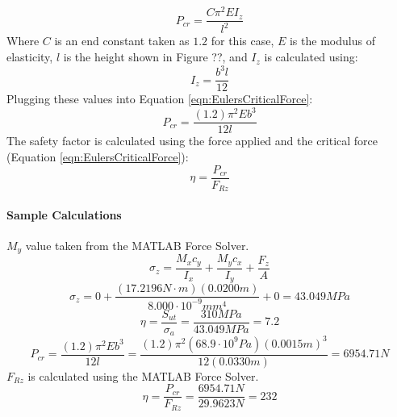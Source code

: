 \documentclass[../main.tex]{subfiles}
\begin{document}
\begin{equation} \label{eqn:EulersCriticalForce}
P_{cr} = \frac{C\pi^2EI_z}{l^2}
\end{equation}
Where $C$ is an end constant taken as $1.2$ for this case, $E$ is the modulus of elasticity, $l$ is the height shown in Figure ??, and $I_z$ is calculated using:
\begin{equation}
I_z = \frac{b^3l}{12}
\end{equation}
Plugging these values into Equation \ref{eqn:EulersCriticalForce}:
\begin{equation}
P_{cr} = \frac{(1.2)\pi^2Eb^3}{12l}
\end{equation}
The safety factor is calculated using the force applied and the critical force (Equation \ref{eqn:EulersCriticalForce}):
\begin{equation}
\eta = \frac{P_{cr}}{F_{Rz}}
\end{equation}
\paragraph*{Sample Calculations}
$M_y$ value taken from the MATLAB Force Solver.
$$\sigma_{z}={\frac{M_{x}c_y}{I_x}}+{\frac{M_{y}c_x}{I_y}}+{\frac{F_z}{A}}$$
$$\sigma_{z}=0+\frac{(17.2196N\cdot{}m)(0.0200m)}{8.000\cdot{}10^{-9}mm^4}+0 = 43.049MPa$$
$$\eta = \dfrac{S_{ut}}{\sigma _a} = \dfrac{310MPa}{43.049MPa}=7.2$$
$$P_{cr} = \frac{(1.2)\pi^2Eb^3}{12l}=\frac{(1.2)\pi^2(68.9\cdot{}10^9Pa)(0.0015m)^3}{12(0.0330m)}=6954.71N$$
$F_{Rz}$ is calculated using the MATLAB Force Solver.
$$\eta = \frac{P_{cr}}{F_{Rz}} = \frac{6954.71N}{29.9623N} = 232$$
\end{document}

